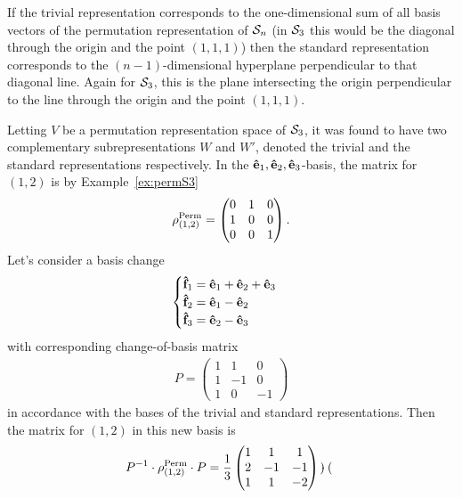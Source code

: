If the trivial representation corresponds to the one-dimensional sum of all basis vectors of the permutation representation of $\mathcal{S}_n$ (in $\mathcal{S}_3$ this would be the diagonal through the origin and the point $(1,1,1)$) then the standard representation corresponds to the $(n-1)$-dimensional hyperplane perpendicular to that diagonal line. Again for $\mathcal{S}_3$, this is the plane intersecting the origin perpendicular to the line through the origin and the point $(1,1,1)$.

\begin{example}
		Letting $V$ be a permutation representation space of $\mathcal{S}_3$, it was found to have two complementary subrepresentations $W$ and $W'$, denoted the trivial and the standard representations respectively. In the $\mathbf{\hat{e}}_1, \mathbf{\hat{e}}_2, \mathbf{\hat{e}}_3$-basis, the matrix for $(1,2)$ is by Example~\ref{ex:permS3}
		\begin{align*}
			\rho^{\text{Perm}}_{(1,2)} = \begin{pmatrix}
				0&1&0 \\ 1&0&0 \\ 0&0&1
			\end{pmatrix}.
		\end{align*}
		Let's consider a basis change 
		\begin{align*}
			\begin{cases}
				\mathbf{\hat{f}}_1 = \mathbf{\hat{e}}_1 + \mathbf{\hat{e}}_2 + \mathbf{\hat{e}}_3 \\
				\mathbf{\hat{f}}_2 = \mathbf{\hat{e}}_1 - \mathbf{\hat{e}}_2 \\
				\mathbf{\hat{f}}_3 = \mathbf{\hat{e}}_2 - \mathbf{\hat{e}}_3
			\end{cases}
		\end{align*}
		with corresponding change-of-basis matrix
		\begin{align*}
			P = \begin{pmatrix}
				1&1&0 \\ 1&-1&0 \\ 1&0&-1
			\end{pmatrix}
		\end{align*}
		in accordance with the bases of the trivial and standard representations. Then the matrix for $(1,2)$ in this new basis is
		\begin{align*}
			P^{-1} \cdot \rho^{\text{Perm}}_{(1,2)} \cdot P &= 
			\frac{1}{3}\begin{pmatrix}
				1&1&1\\2&-1&-1\\1&1&-2
			\end{pmatrix} \cdot \begin{pmatrix}

\end{pmatrix}
\end{align*}
\end{example}
